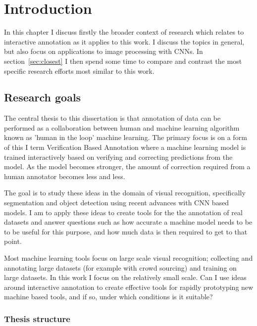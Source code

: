 


\chapter{Introduction}

In this chapter I discuss firstly the broader context of research which relates to interactive annotation as it applies to this work. I discuss the topics in general, but also focus on applications to image processing with \gls{CNN}s. In section~\ref{sec:closest} I then spend some time to compare and contrast the most specific research efforts most similar to this work.

\section{Research goals}

The central thesis to this dissertation is that annotation of data can be performed as a collaboration between human and machine learning algorithm known as 'human in the loop' machine learning. The primary focus is on a form of this I term Verification Based Annotation where a machine learning model is trained interactively based on verifying and correcting predictions from the model. As the model becomes stronger, the amount of correction required from a human annotator becomes less and less.

The goal is to study these ideas in the domain of visual recognition, specifically segmentation and object detection using recent advances with \gls{CNN} based models. I am to apply these ideas to create tools for the the annotation of real datasets and answer questions such as how accurate a machine model needs to be to be useful for this purpose, and how much data is then required to get to that point.

Most machine learning tools focus on large scale visual recognition; collecting and annotating large datasets (for example with crowd sourcing) and training on large datasets. In this work I focus on the relatively small scale. Can I use ideas around interactive annotation to create effective tools for rapidly prototyping new machine based tools, and if so, under which conditions is it suitable?



\subsection {Thesis structure}


